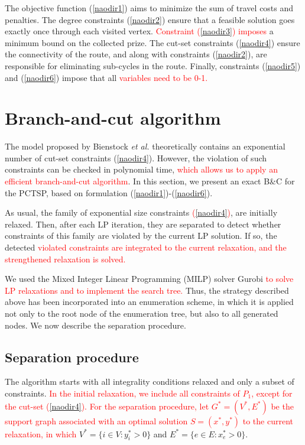 \documentclass{ro}
\begin{document}
The objective function (\ref{naodir1}) aims to minimize the sum of travel costs and penalties. The degree constraints (\ref{naodir2}) ensure that a
feasible solution goes exactly once through each visited vertex. \textcolor{red}{Constraint (\ref{naodir3}) imposes} a minimum bound on the collected prize. The cut-set constraints (\ref{naodir4}) ensure the connectivity of the route, and along with constraints (\ref{naodir2}), are responsible for eliminating sub-cycles in the route. Finally, constraints (\ref{naodir5}) and (\ref{naodir6}) impose that all \textcolor{red}{variables need to be 0-1.}



\section{Branch-and-cut algorithm}
\label{sec:bc}


The model proposed by Bienstock \textit{et al.} \cite{bienstock1993note} theoretically contains an exponential number of cut-set constraints (\ref{naodir4}). However, the violation of such constraints can be checked in polynomial time, \textcolor{red}{ which allows us to apply an efficient branch-and-cut algorithm}. In this section, we present an  exact B\&C for the PCTSP, based on formulation (\ref{naodir1})-(\ref{naodir6}).

As usual, the family of exponential size constraints \textcolor{red}{(\ref{naodir4})}, are initially
relaxed. Then, after each LP iteration, they are separated
to detect whether constraints of this family are
violated by the current LP solution. If so, the detected \textcolor{red}{
violated constraints are integrated to the current relaxation, and the strengthened relaxation is solved.
}

We used the Mixed Integer Linear Programming (MILP) solver Gurobi \textcolor{red}{to solve LP relaxations and to implement the search tree.} Thus, the strategy described above has been incorporated into an enumeration scheme, in which it is applied not only to the root node of the enumeration tree, but also to all generated nodes. We now describe the separation procedure.

\subsection{Separation procedure}

The algorithm starts with all integrality conditions relaxed and only a subset of constraints. \textcolor{red}{In the initial relaxation, we include all constraints of $P_1$, except for the cut-set (\ref{naodir4}). For the separation procedure, let $G^*=(V^*,E^*)$ be the support graph associated with an optimal solution $S=(x^*,y^*)$ to the current relaxation, in which} $V^* = \{i \in V : y_i^* > 0\}$ and $E^* = \{e \in E : x_e^* >0 \}$. 
\end{document}
